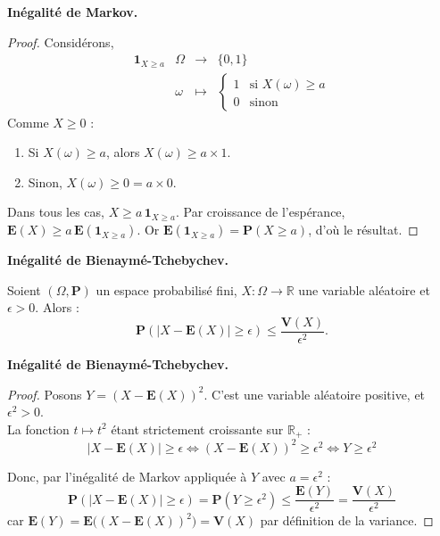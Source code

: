 \documentclass{beamer}
\begin{document}
\begin{frame}{\textbf{Inégalité de Markov.}}
    \begin{proof}
    Considérons,
    \[
        \begin{array}{c|ccc}
            \mathbf{1}_{X \geq a} & \Omega & \longrightarrow & \{0,1\}
            \\[0.3em]
            & \omega & \longmapsto &
            \begin{cases}
                1 & \text{si } X(\omega) \geq a \\
                0 & \text{sinon}
            \end{cases}
        \end{array}
    \]
    Comme $X \geq 0$ :
    \begin{enumerate}[label=(\alph*)]
        \item Si $X(\omega) \geq a$, alors $X(\omega) \geq a \times 1$.
        \item Sinon, $X(\omega) \geq 0 = a \times 0$.
    \end{enumerate}
    Dans tous les cas, $X \geq a \, \mathbf{1}_{X \geq a}$.
    Par croissance de l'espérance, $\mathbf{E}(X) \geq a\,\mathbf{E}(\mathbf{1}_{X \geq a})$.
    Or $\mathbf{E}(\mathbf{1}_{X \geq a}) = \mathbf{P}(X \geq a)$, d'où le résultat.
\end{proof}
\end{frame}

\begin{frame}{\textbf{Inégalité de Bienaymé-Tchebychev.}}
    \begin{theorem}
        Soient $(\Omega, \mathbf{P})$ un espace probabilisé fini, $X : \Omega \longrightarrow \mathbb{R}$ une variable aléatoire et $\epsilon > 0$. Alors :
        \[
            \mathbf{P}(| X - \mathbf{E}(X) | \geq \epsilon) \leq \frac{\mathbf{V}(X)}{\epsilon^2}.
        \]
    \end{theorem}
\end{frame}

\begin{frame}{\textbf{Inégalité de Bienaymé-Tchebychev.}}
    \begin{proof}
        Posons $Y = (X - \mathbf{E}(X))^2$. C'est une variable aléatoire
        positive, et $\epsilon^2 > 0$. \\[0.5em]

        La fonction $t \longmapsto t^2$ étant strictement croissante sur
        $\mathbb{R}_+$ :
        \[
            |X - \mathbf{E}(X)| \geq \epsilon
            \iff (X - \mathbf{E}(X))^2 \geq \epsilon^2
            \iff Y \geq \epsilon^2
        \]

        Donc, par l'inégalité de Markov appliquée à $Y$ avec $a = \epsilon^2$ :
        \[
            \mathbf{P}(|X - \mathbf{E}(X)| \geq \epsilon)
            = \mathbf{P}(Y \geq \epsilon^2)
            \leq \frac{\mathbf{E}(Y)}{\epsilon^2}
            = \frac{\mathbf{V}(X)}{\epsilon^2}
        \]
        car $\mathbf{E}(Y) = \mathbf{E}\big((X - \mathbf{E}(X))^2\big) = \mathbf{V}(X)$ par définition de la variance.
    \end{proof}
\end{frame}
\end{document}
